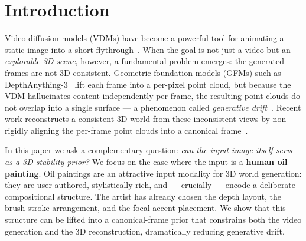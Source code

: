 
\section{Introduction}
\label{sec:intro}

Video diffusion models (VDMs) have become a powerful tool for animating a
static image into a short flythrough~\cite{wan2025,viewcrafter,gen3c,seva}.
When the goal is not just a video but an \emph{explorable 3D scene}, however,
a fundamental problem emerges: the generated frames are not 3D-consistent.
Geometric foundation models (GFMs) such as DepthAnything-3~\cite{da3} lift
each frame into a per-pixel point cloud, but because the VDM hallucinates
content independently per frame, the resulting point clouds do not overlap
into a single surface --- a phenomenon called \emph{generative
drift}~\cite{hoellein2026worldreconstruction}. Recent work reconstructs a
consistent 3D world from these inconsistent views by non-rigidly aligning the
per-frame point clouds into a canonical frame~\cite{hoellein2026worldreconstruction}.

In this paper we ask a complementary question: \emph{can the input image
itself serve as a 3D-stability prior?} We focus on the case where the input is
a \textbf{human oil painting}. Oil paintings are an attractive input modality
for 3D world generation: they are user-authored, stylistically rich, and ---
crucially --- encode a deliberate compositional structure. The artist has
already chosen the depth layout, the brush-stroke arrangement, and the
focal-accent placement. We show that this structure can be lifted into a
canonical-frame prior that constrains both the video generation and the 3D
reconstruction, dramatically reducing generative drift.

